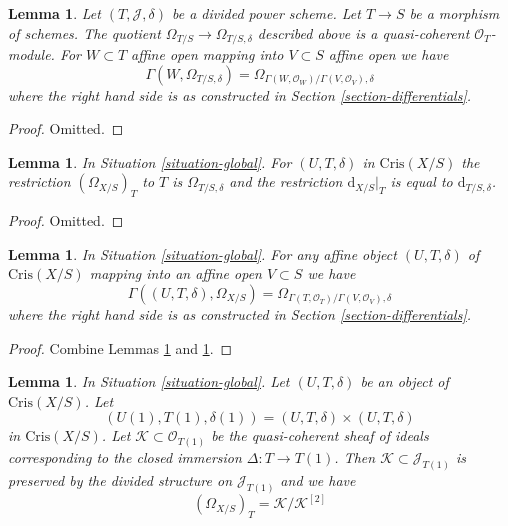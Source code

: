 \documentclass{stacks-project}
\theoremstyle{plain}
\newtheorem{lemma}[subsection]{Lemma}
\theoremstyle{definition}
\theoremstyle{remark}
\numberwithin{equation}{subsection}
\begin{document}
\begin{lemma}
\label{lemma-module-differentials-divided-power-scheme}
Let $(T, \mathcal{J}, \delta)$ be a divided power scheme.
Let $T \to S$ be a morphism of schemes.
The quotient $\Omega_{T/S} \to \Omega_{T/S, \delta}$
described above is a quasi-coherent $\mathcal{O}_T$-module.
For $W \subset T$ affine open mapping into $V \subset S$ affine open
we have
$$
\Gamma(W, \Omega_{T/S, \delta}) =
\Omega_{\Gamma(W, \mathcal{O}_W)/\Gamma(V, \mathcal{O}_V), \delta}
$$
where the right hand side is
as constructed in Section \ref{section-differentials}.
\end{lemma}

\begin{proof}
Omitted.
\end{proof}

\begin{lemma}
\label{lemma-module-of-differentials}
In Situation \ref{situation-global}.
For $(U, T, \delta)$ in $\text{Cris}(X/S)$ the restriction
$(\Omega_{X/S})_T$ to $T$ is $\Omega_{T/S, \delta}$ and the restriction
$\text{d}_{X/S}|_T$ is equal to $\text{d}_{T/S, \delta}$.
\end{lemma}

\begin{proof}
Omitted.
\end{proof}

\begin{lemma}
\label{lemma-module-of-differentials-on-affine}
In Situation \ref{situation-global}.
For any affine object $(U, T, \delta)$ of $\text{Cris}(X/S)$
mapping into an affine open $V \subset S$ we have
$$
\Gamma((U, T, \delta), \Omega_{X/S}) =
\Omega_{\Gamma(T, \mathcal{O}_T)/\Gamma(V, \mathcal{O}_V), \delta}
$$
where the right hand side is
as constructed in Section \ref{section-differentials}.
\end{lemma}

\begin{proof}
Combine Lemmas \ref{lemma-module-differentials-divided-power-scheme} and
\ref{lemma-module-of-differentials}.
\end{proof}

\begin{lemma}
\label{lemma-describe-omega-small}
In Situation \ref{situation-global}.
Let $(U, T, \delta)$ be an object of $\text{Cris}(X/S)$.
Let
$$
(U(1), T(1), \delta(1)) = (U, T, \delta) \times (U, T, \delta)
$$
in $\text{Cris}(X/S)$. Let $\mathcal{K} \subset \mathcal{O}_{T(1)}$
be the quasi-coherent sheaf of ideals corresponding to the closed
immersion $\Delta : T \to T(1)$. Then
$\mathcal{K} \subset \mathcal{J}_{T(1)}$ is preserved by the
divided structure on $\mathcal{J}_{T(1)}$ and we have
$$
(\Omega_{X/S})_T = \mathcal{K}/\mathcal{K}^{[2]}
$$
\end{lemma}
\end{document}
